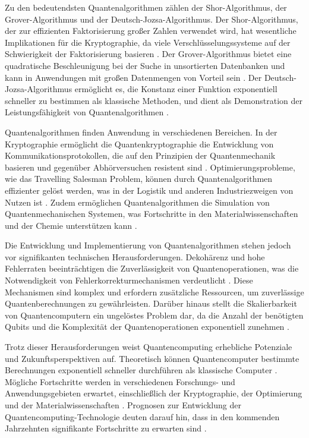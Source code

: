 Zu den bedeutendsten Quantenalgorithmen zählen der Shor-Algorithmus, der Grover-Algorithmus und der 
Deutsch-Jozsa-Algorithmus. Der Shor-Algorithmus, der zur effizienten Faktorisierung großer Zahlen 
verwendet wird, hat wesentliche Implikationen für die Kryptographie, da viele Verschlüsselungssysteme 
auf der Schwierigkeit der Faktorisierung basieren \cite{shor1999polynomial}. Der Grover-Algorithmus bietet eine 
quadratische Beschleunigung bei der Suche in unsortierten Datenbanken und kann in Anwendungen mit 
großen Datenmengen von Vorteil sein \cite{grover1996fast}. Der Deutsch-Jozsa-Algorithmus ermöglicht es, die 
Konstanz einer Funktion exponentiell schneller zu bestimmen als klassische Methoden, und dient als 
Demonstration der Leistungsfähigkeit von Quantenalgorithmen \cite{deutsch1992rapid}.

Quantenalgorithmen finden Anwendung in verschiedenen Bereichen. In der Kryptographie ermöglicht die 
Quantenkryptographie die Entwicklung von Kommunikationsprotokollen, die auf den Prinzipien der 
Quantenmechanik basieren und gegenüber Abhörversuchen resistent sind \cite{bennett2014quantum}. 
Optimierungsprobleme, wie das Travelling Salesman Problem, können durch Quantenalgorithmen effizienter 
gelöst werden, was in der Logistik und anderen Industriezweigen von Nutzen ist \cite{farhi2000quantum}. 
Zudem ermöglichen Quantenalgorithmen die Simulation von Quantenmechanischen Systemen, was Fortschritte 
in den Materialwissenschaften und der Chemie unterstützen kann \cite{aspuru2005simulated}.

Die Entwicklung und Implementierung von Quantenalgorithmen stehen jedoch vor signifikanten technischen 
Herausforderungen. Dekohärenz und hohe Fehlerraten beeinträchtigen die Zuverlässigkeit von Quantenoperationen, 
was die Notwendigkeit von Fehlerkorrekturmechanismen verdeutlicht \cite{preskill2018quantum}. Diese Mechanismen sind 
komplex und erfordern zusätzliche Ressourcen, um zuverlässige Quantenberechnungen zu gewährleisten. 
Darüber hinaus stellt die Skalierbarkeit von Quantencomputern ein ungelöstes Problem dar, da die Anzahl 
der benötigten Qubits und die Komplexität der Quantenoperationen exponentiell zunehmen \cite{monroe2013scaling}.

Trotz dieser Herausforderungen weist Quantencomputing erhebliche Potenziale und Zukunftsperspektiven auf. 
Theoretisch können Quantencomputer bestimmte Berechnungen exponentiell schneller durchführen als klassische 
Computer \cite{nielsen2010quantum}. Mögliche Fortschritte werden in verschiedenen Forschungs- und 
Anwendungsgebieten erwartet, einschließlich der Kryptographie, der Optimierung und der 
Materialwissenschaften \cite{arute2019quantum}. Prognosen zur Entwicklung der Quantencomputing-Technologie 
deuten darauf hin, dass in den kommenden Jahrzehnten signifikante Fortschritte zu erwarten sind \cite{ladd2010quantum}.

